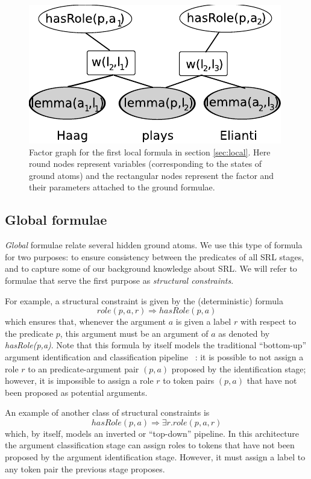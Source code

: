 \begin{figure}
\begin{center}
    \includegraphics[scale=.70]{LocalFormula2}
\end{center}
\caption{Factor graph for the first local formula in section \ref{sec:local}. Here round nodes represent variables (corresponding to the states of ground atoms) and the rectangular nodes represent the factor and their parameters attached to the ground formulae.}
\label{fig:local2}
\end{figure}

\subsection{Global formulae}
\label{sec:global}

\emph{Global} formulae relate several hidden ground atoms. We use this type of formula for two purposes: to ensure consistency between the predicates of all SRL stages, and to capture some of our background knowledge about SRL. We will refer to formulae that serve the first purpose as \emph{structural constraints}. 

For example, a structural constraint is given by the (deterministic) formula
\[role(p,a,r) \Rightarrow hasRole(p,a)\]
which ensures that, whenever the argument $a$ is given a label $r$ with respect to the predicate $p$, this argument must be an argument of $a$ as denoted by \emph{hasRole(p,a)}. Note that this formula by itself models the traditional ``bottom-up'' argument identification and classification pipeline~ \citep{xue04calibrating}: it is possible to not assign a role $r$ to an predicate-argument pair $(p,a)$ proposed by the identification stage; however, it is impossible to assign a role $r$ to token pairs $(p,a)$ that have not been proposed as potential arguments.

An example of another class of structural constraints is 
\[
hasRole(p,a)\Rightarrow\exists r.role(p,a,r)
\]
which, by itself, models an inverted or ``top-down'' pipeline. In this architecture the argument classification stage can assign roles to tokens that have not been proposed by the argument identification stage. However, it must assign a label to any token pair the previous stage proposes. 

